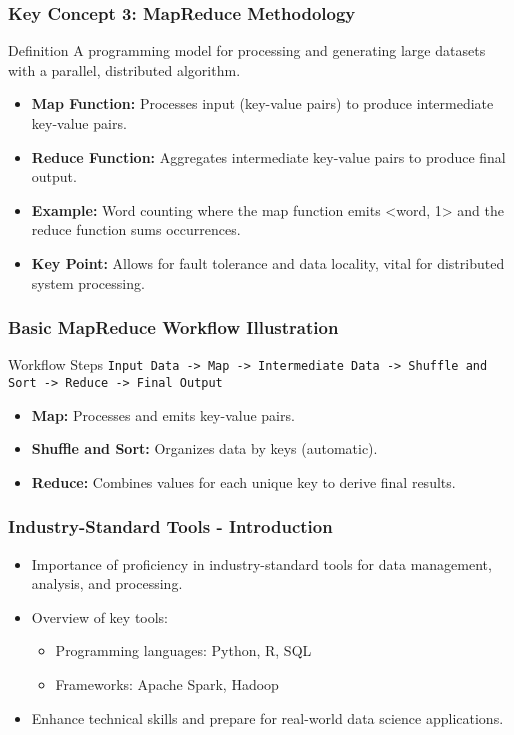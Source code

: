 \documentclass[aspectratio=169]{beamer}
\begin{document}
\begin{frame}[fragile]
    \frametitle{Key Concept 3: MapReduce Methodology}
    \begin{block}{Definition}
        A programming model for processing and generating large datasets with a parallel, distributed algorithm.
    \end{block}
    \begin{itemize}
        \item \textbf{Map Function:} 
            Processes input (key-value pairs) to produce intermediate key-value pairs.
        \item \textbf{Reduce Function:} 
            Aggregates intermediate key-value pairs to produce final output.
        \item \textbf{Example:} 
            Word counting where the map function emits <word, 1> and the reduce function sums occurrences.
        \item \textbf{Key Point:} 
            Allows for fault tolerance and data locality, vital for distributed system processing.
    \end{itemize}    
\end{frame}

\begin{frame}[fragile]
    \frametitle{Basic MapReduce Workflow Illustration}
    \begin{block}{Workflow Steps}
        \texttt{Input Data -> Map -> Intermediate Data -> Shuffle and Sort -> Reduce -> Final Output}
    \end{block}
    \begin{itemize}
        \item \textbf{Map:} Processes and emits key-value pairs.
        \item \textbf{Shuffle and Sort:} Organizes data by keys (automatic).
        \item \textbf{Reduce:} Combines values for each unique key to derive final results.
    \end{itemize}
\end{frame}

\begin{frame}[fragile]
    \frametitle{Industry-Standard Tools - Introduction}
    \begin{itemize}
        \item Importance of proficiency in industry-standard tools for data management, analysis, and processing.
        \item Overview of key tools:
            \begin{itemize}
                \item Programming languages: Python, R, SQL
                \item Frameworks: Apache Spark, Hadoop
            \end{itemize}
        \item Enhance technical skills and prepare for real-world data science applications.
    \end{itemize}
\end{frame}
\end{document}
